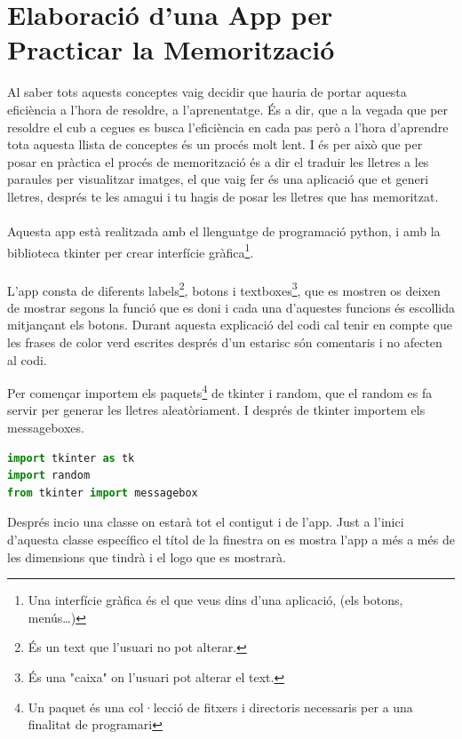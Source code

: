 \section{Elaboració d'una App per Practicar la Memorització}

Al saber tots aquests conceptes vaig decidir que hauria de portar aquesta eficiència a l'hora de resoldre, a l'aprenentatge. És a dir, que a la vegada que per resoldre el cub a cegues es busca l'eficiència en cada pas però a l'hora d'aprendre tota aquesta llista de conceptes és un procés molt lent.
I és per això que per posar en pràctica el procés de memorització és a dir el traduir les lletres a les paraules per visualitzar imatges, el que vaig fer és una aplicació que et generi lletres, després te les amagui i tu hagis de posar les lletres que has memoritzat.
\\\\Aquesta app està realitzada amb el llenguatge de programació python, i amb la biblioteca tkinter per crear interfície gràfica\footnote{Una interfície gràfica és el que veus dins d'una aplicació, (els botons, menús\dots)}.
\\\\L'app consta de diferents labels\footnote{És un text que l'usuari no pot alterar.}, botons i textboxes\footnote{És una "caixa" on l'usuari pot alterar el text.}, que es mostren os deixen de mostrar segons la funció que es doni i cada una d'aquestes funcions és escollida mitjançant els botons. Durant aquesta explicació del codi cal tenir en compte que les frases de color verd escrites després d'un estarisc són comentaris i no afecten al codi.

\vspace{0.5cm}

Per començar importem els paquets\footnote{Un paquet és una col·lecció de fitxers i directoris necessaris per a una finalitat de programari} de tkinter i random, que el random es fa servir per generar les lletres aleatòriament. I després de tkinter importem els messageboxes.

\begin{lstlisting}[language=Python, style=colorEX, caption=Importació de paquets]
import tkinter as tk
import random
from tkinter import messagebox
\end{lstlisting}

Després incio una classe on estarà tot el contigut i de l'app. Just a l'inici d'aquesta classe específico el títol de la finestra on es mostra l'app a més a més de les dimensions que tindrà i el logo que es mostrarà. 


